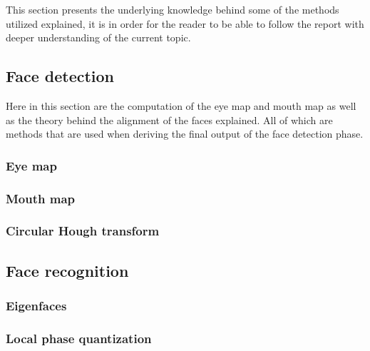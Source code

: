 This section presents the underlying knowledge behind some of the methods utilized explained, it is in order for the reader to be able to follow the report with deeper understanding of the current topic.

\subsection{Face detection}

Here in this section are the computation of the eye map and mouth map as well as the theory behind the alignment of the faces explained. All of which are methods that are used when deriving the final output of the face detection phase.

\subsubsection{Eye map}
\label{sub:FaceDetection}


\subsubsection{Mouth map}


\subsubsection{Circular Hough transform}


\subsection{Face recognition}
\label{sub:FaceRecognition}


\subsubsection{Eigenfaces}
\label{subs:Eigenfaces}


\subsubsection{Local phase quantization}
\label{subs:LocalPhaseQuantization}

